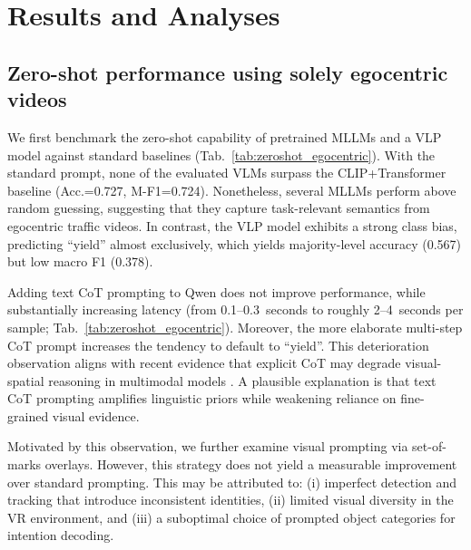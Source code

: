 \documentclass[letterpaper, 10pt, journal]{IEEEtran}  %
\begin{document}
\section{Results and Analyses}
\label{sec:results_n_analysis}

\subsection{Zero-shot performance using solely egocentric videos}

We first benchmark the zero-shot capability of pretrained MLLMs and a VLP model against standard baselines (Tab.~\ref{tab:zeroshot_egocentric}). With the standard prompt, none of the evaluated VLMs surpass the CLIP+Transformer baseline (Acc.=0.727, M-F1=0.724). Nonetheless, several MLLMs perform above random guessing, suggesting that they capture task-relevant semantics from egocentric traffic videos. In contrast, the VLP model exhibits a strong class bias, predicting ``yield'' almost exclusively, which yields majority-level accuracy (0.567) but low macro F1 (0.378).

Adding text CoT prompting to Qwen does not improve performance, while substantially increasing latency (from 0.1--0.3~seconds to roughly 2--4~seconds per sample; Tab.~\ref{tab:zeroshot_egocentric}). Moreover, the more elaborate multi-step CoT prompt increases the tendency to default to ``yield''. This deterioration observation aligns with recent evidence that explicit CoT may degrade visual-spatial reasoning in multimodal models \cite{dai2026latentomni}. A plausible explanation is that text CoT prompting amplifies linguistic priors while weakening reliance on fine-grained visual evidence.

Motivated by this observation, we further examine visual prompting via set-of-marks overlays. However, this strategy does not yield a measurable improvement over standard prompting. This may be attributed to: (i) imperfect detection and tracking that introduce inconsistent identities, (ii) limited visual diversity in the VR environment, and (iii) a suboptimal choice of prompted object categories for intention decoding.
\end{document}
